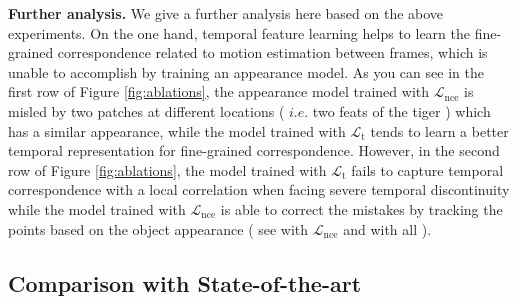 \documentclass{article}
\begin{document}
\textbf{Further analysis.} 
We give a further analysis here based on the above experiments. On the one hand, temporal feature learning helps to learn the fine-grained correspondence related to motion estimation between frames, which is unable to accomplish by training an appearance model. As you can see in the first row of Figure \ref{fig:ablations}, the appearance model trained with $\mathcal{L}_{\mathrm{nce}}$ is misled by two patches at different locations ( $i.e.$ two feats of the tiger ) which has a similar appearance, while the model trained with $\mathcal{L}_{\mathrm{t}}$ tends to learn a better temporal representation for fine-grained correspondence. However, in the second row of Figure \ref{fig:ablations}, the model trained with $\mathcal{L}_{\mathrm{t}}$ fails to capture temporal correspondence with a local correlation when facing severe temporal discontinuity while the model trained with $\mathcal{L}_{\mathrm{nce}}$ is able to correct the mistakes by tracking the points based on the object appearance ( see with $\mathcal{L}_{\mathrm{nce}}$ and with all ).

\subsection{Comparison with State-of-the-art}
\end{document}
